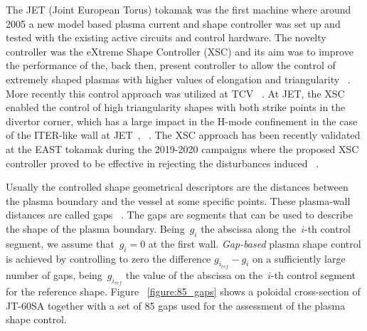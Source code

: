 The JET (Joint European Torus) tokamak was the first machine where around 2005 a new model based plasma current and shape controller was set up and tested  with the existing active circuits and control hardware. The novelty controller was the eXtreme Shape Controller (XSC) and its aim was to improve  the performance of the, back then, present controller to allow the control of extremely shaped plasmas with higher values of elongation and triangularity ~\cite{Albanese2005}. More recently this control approach was utilized at TCV ~\cite{anand2017novel}. At JET, the XSC  enabled the control of high triangularity shapes with both strike points in the divertor corner, which has a large impact in the H-mode confinement in the case of the ITER-like wall at JET~\cite{de2016recent}, ~\cite{Albanese2005}.   The XSC approach has been recently validated at the EAST tokamak during the 2019-2020 campaigns where the proposed XSC controller proved to be effective in rejecting the disturbances induced  ~\cite{EAST2020}.
 \smallskip
 
 Usually the controlled shape geometrical descriptors are the distances between the plasma boundary and the vessel at some specific points. These plasma-wall distances are called gaps ~\cite{Ambrosino:TCST2008}. The gaps are segments that can be used to describe the shape of the plasma boundary. Being~$g_i$ the abscissa along the~$i$-th control segment, we assume that~$g_i=0$ at the first wall. \emph{Gap-based} plasma shape control is achieved by controlling to zero the difference $g_{i_{ref}}-g_i$ on a sufficiently large number of gaps, being~$g_{i_{ref}}$ the value of the abscissa on the~$i$-th control segment for the reference shape. Figure ~\ref{figure:85_gaps} shows a poloidal cross-section of JT-60SA together with a set of 85 gaps used for the assessment of the plasma shape control.
 \smallskip
 
